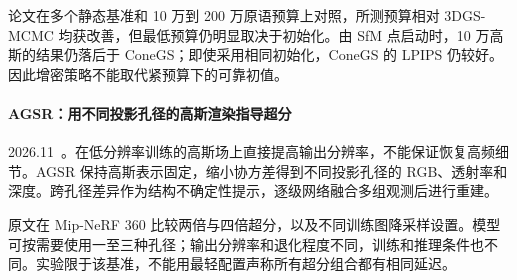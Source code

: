 论文在多个静态基准和 10 万到 200 万原语预算上对照，所测预算相对 3DGS-MCMC 均获改善，但最低预算仍明显取决于初始化。由 SfM 点启动时，10 万高斯的结果仍落后于 ConeGS；即使采用相同初始化，ConeGS 的 LPIPS 仍较好。因此增密策略不能取代紧预算下的可靠初值。

\paragraph{AGSR：用不同投影孔径的高斯渲染指导超分}
2026.11~\cite{2611_25934}。在低分辨率训练的高斯场上直接提高输出分辨率，不能保证恢复高频细节。AGSR 保持高斯表示固定，缩小协方差得到不同投影孔径的 RGB、透射率和深度。跨孔径差异作为结构不确定性提示，逐级网络融合多组观测后进行重建。

原文在 Mip-NeRF 360 比较两倍与四倍超分，以及不同训练图降采样设置。模型可按需要使用一至三种孔径；输出分辨率和退化程度不同，训练和推理条件也不同。实验限于该基准，不能用最轻配置声称所有超分组合都有相同延迟。
